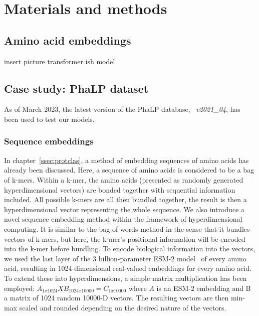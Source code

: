 \chapter[Materials and methods]{Materials and methods}
\section{Amino acid embeddings}
insert picture transformer ish model
\section{Case study: PhaLP dataset}
As of March 2023, the latest version of the PhaLP database, ~\textit{v2021\_04}, has been used to test our models.

\subsection*{Sequence embeddings}
In chapter~\ref{ssec:protclas}, a method of embedding sequences of amino acids has already been discussed. Here, a sequence of amino acids is considered to be a bag of k-mers. Within a k-mer, the amino acids (presented as randomly generated hyperdimensional vectors) are bonded together with sequential information included. All possible k-mers are all then bundled together, the result is then a hyperdimensional vector representing the whole sequence. We also introduce a novel sequence embedding method within the framework of hyperdimensional computing. It is similar to the bag-of-words method in the sense that it bundles vectors of k-mers, but here, the k-mer's positional information will be encoded into the k-mer before bundling. 
To encode biological information into the vectors, we used the last layer of the 3 billion-parameter ESM-2 model~\cite{esm2} of every amino acid, resulting in 1024-dimensional real-valued embeddings for every amino acid. To extend these into hyperdimensions, a simple matrix multiplication has been employed: $A_{1x1024}X B_{1024x10000} = C_{1x10000}$ where $A$ is an ESM-2 embedding and B a matrix of 1024 random 10000-D vectors. The resulting vectors are then min-max scaled and rounded depending on the desired nature of the vectors.
